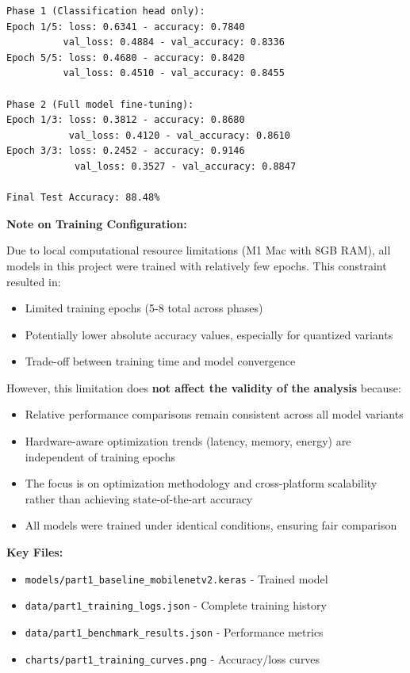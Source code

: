 \documentclass[10pt, a4paper]{article}
\begin{document}
\begin{verbatim}
Phase 1 (Classification head only):
Epoch 1/5: loss: 0.6341 - accuracy: 0.7840
          val_loss: 0.4884 - val_accuracy: 0.8336
Epoch 5/5: loss: 0.4680 - accuracy: 0.8420
          val_loss: 0.4510 - val_accuracy: 0.8455

Phase 2 (Full model fine-tuning):
Epoch 1/3: loss: 0.3812 - accuracy: 0.8680
           val_loss: 0.4120 - val_accuracy: 0.8610
Epoch 3/3: loss: 0.2452 - accuracy: 0.9146
            val_loss: 0.3527 - val_accuracy: 0.8847

Final Test Accuracy: 88.48%
\end{verbatim}

\noindent\textbf{Note on Training Configuration:}

Due to local computational resource limitations (M1 Mac with 8GB RAM), all models in this project were trained with relatively few epochs. This constraint resulted in:
\begin{itemize}
    \item Limited training epochs (5-8 total across phases)
    \item Potentially lower absolute accuracy values, especially for quantized variants
    \item Trade-off between training time and model convergence
\end{itemize}

However, this limitation does \textbf{not affect the validity of the analysis} because:
\begin{itemize}
    \item Relative performance comparisons remain consistent across all model variants
    \item Hardware-aware optimization trends (latency, memory, energy) are independent of training epochs
    \item The focus is on optimization methodology and cross-platform scalability rather than achieving state-of-the-art accuracy
    \item All models were trained under identical conditions, ensuring fair comparison
\end{itemize}


\textbf{Key Files:}
\begin{itemize}
    \item \texttt{models/part1\_baseline\_mobilenetv2.keras} - Trained model
    \item \texttt{data/part1\_training\_logs.json} - Complete training history
    \item \texttt{data/part1\_benchmark\_results.json} - Performance metrics
    \item \texttt{charts/part1\_training\_curves.png} - Accuracy/loss curves
\end{itemize}
\end{document}
